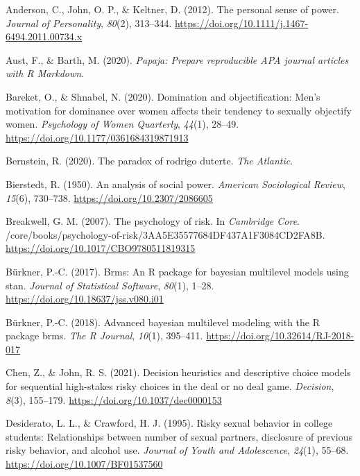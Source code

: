 \documentclass[
  donotrepeattitle,doc, 12pt, a4paper,floatsintext]{apa7}
\newlength{\cslhangindent}
\newlength{\cslentryspacingunit} %
\newenvironment{CSLReferences}[2] %
 {%
  \setlength{\parindent}{0pt}
  \ifodd #1
  \let\oldpar\par
  \def\par{\hangindent=\cslhangindent\oldpar}
  \fi
  \setlength{\parskip}{#2\cslentryspacingunit}
 }%
 {}
\begin{document}
\hypertarget{refs}{}
\begin{CSLReferences}{1}{0}
\leavevmode{}%
Anderson, C., John, O. P., \& Keltner, D. (2012). The personal sense of power. \emph{Journal of Personality}, \emph{80}(2), 313--344. \url{https://doi.org/10.1111/j.1467-6494.2011.00734.x}

\leavevmode{}%
Aust, F., \& Barth, M. (2020). \emph{Papaja: {Prepare} reproducible {APA} journal articles with {R Markdown}}.

\leavevmode{}%
Bareket, O., \& Shnabel, N. (2020). Domination and objectification: Men's motivation for dominance over women affects their tendency to sexually objectify women. \emph{Psychology of Women Quarterly}, \emph{44}(1), 28--49. \url{https://doi.org/10.1177/0361684319871913}

\leavevmode{}%
Bernstein, R. (2020). The paradox of rodrigo duterte. \emph{The Atlantic}.

\leavevmode{}%
Bierstedt, R. (1950). An analysis of social power. \emph{American Sociological Review}, \emph{15}(6), 730--738. \url{https://doi.org/10.2307/2086605}

\leavevmode{}%
Breakwell, G. M. (2007). The psychology of risk. In \emph{Cambridge Core}. /core/books/psychology-of-risk/3AA5E35577684DF437A1F3084CD2FA8B. \url{https://doi.org/10.1017/CBO9780511819315}

\leavevmode{}%
Bürkner, P.-C. (2017). Brms: An {R} package for bayesian multilevel models using stan. \emph{Journal of Statistical Software}, \emph{80}(1), 1--28. \url{https://doi.org/10.18637/jss.v080.i01}

\leavevmode{}%
Bürkner, P.-C. (2018). Advanced bayesian multilevel modeling with the {R} package brms. \emph{The R Journal}, \emph{10}(1), 395--411. \url{https://doi.org/10.32614/RJ-2018-017}

\leavevmode{}%
Chen, Z., \& John, R. S. (2021). Decision heuristics and descriptive choice models for sequential high-stakes risky choices in the deal or no deal game. \emph{Decision}, \emph{8}(3), 155--179. \url{https://doi.org/10.1037/dec0000153}

\leavevmode{}%
Desiderato, L. L., \& Crawford, H. J. (1995). Risky sexual behavior in college students: Relationships between number of sexual partners, disclosure of previous risky behavior, and alcohol use. \emph{Journal of Youth and Adolescence}, \emph{24}(1), 55--68. \url{https://doi.org/10.1007/BF01537560}


\end{CSLReferences}
\end{document}
